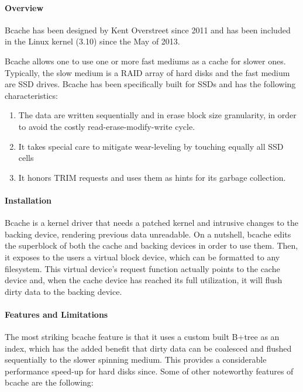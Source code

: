 \paragraph{Overview}

Bcache has been designed by Kent Overstreet since 2011 and has been included in 
the Linux kernel (3.10) since the May of 2013.

Bcache allows one to use one or more fast mediums as a cache for slower ones.  
Typically, the slow medium is a RAID array of hard disks and the fast medium 
are SSD drives. Bcache has been specifically built for SSDs and has the 
following characteristics:

\begin{enumerate}
	\item The data are written sequentially and in erase block size 
		granularity, in order to avoid the costly read-erase-modify-write 
		cycle.
	\item It takes special care to mitigate wear-leveling by touching equally 
		all SSD cells
	\item It honors TRIM requests and uses them as hints for its garbage 
		collection.
\end{enumerate}

\paragraph{Installation}

Bcache is a kernel driver that needs a patched kernel and intrusive changes to 
the backing device, rendering previous data unreadable. On a nutshell, bcache 
edits the superblock of both the cache and backing devices in order to use 
them.  Then, it exposes to the users a virtual block device, which can be 
formatted to any filesystem.  This virtual device's request function actually 
points to the cache device and, when the cache device has reached its full 
utilization, it will flush dirty data to the backing device.

\paragraph{Features and Limitations}

The most striking bcache feature is that it uses a custom built B+tree as an 
index, which has the added benefit that dirty data can be coalesced and flushed 
sequentially to the slower spinning medium. This provides a considerable 
performance speed-up for hard disks since. Some of other noteworthy features of 
bcache are the following:

